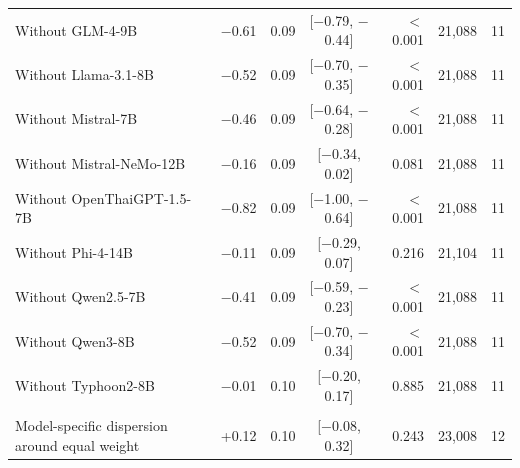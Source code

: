 \begin{tabular}{@{}lrrcrrr@{}}
\quad Without GLM-4-9B & \ensuremath{-}0.61 & 0.09 & [\ensuremath{-}0.79, \ensuremath{-}0.44] & $<$0.001 & 21,088 & 11 \\
\quad Without Llama-3.1-8B & \ensuremath{-}0.52 & 0.09 & [\ensuremath{-}0.70, \ensuremath{-}0.35] & $<$0.001 & 21,088 & 11 \\
\quad Without Mistral-7B & \ensuremath{-}0.46 & 0.09 & [\ensuremath{-}0.64, \ensuremath{-}0.28] & $<$0.001 & 21,088 & 11 \\
\quad Without Mistral-NeMo-12B & \ensuremath{-}0.16 & 0.09 & [\ensuremath{-}0.34, 0.02] & 0.081 & 21,088 & 11 \\
\quad Without OpenThaiGPT-1.5-7B & \ensuremath{-}0.82 & 0.09 & [\ensuremath{-}1.00, \ensuremath{-}0.64] & $<$0.001 & 21,088 & 11 \\
\quad Without Phi-4-14B & \ensuremath{-}0.11 & 0.09 & [\ensuremath{-}0.29, 0.07] & 0.216 & 21,104 & 11 \\
\quad Without Qwen2.5-7B & \ensuremath{-}0.41 & 0.09 & [\ensuremath{-}0.59, \ensuremath{-}0.23] & $<$0.001 & 21,088 & 11 \\
\quad Without Qwen3-8B & \ensuremath{-}0.52 & 0.09 & [\ensuremath{-}0.70, \ensuremath{-}0.34] & $<$0.001 & 21,088 & 11 \\
\quad Without Typhoon2-8B & \ensuremath{-}0.01 & 0.10 & [\ensuremath{-}0.20, 0.17] & 0.885 & 21,088 & 11 \\
\addlinespace
\multicolumn{7}{@{}l}{\textit{Post hoc, not pre-registered}} \\
\quad Model-specific dispersion around equal weight & +0.12 & 0.10 & [\ensuremath{-}0.08, 0.32] & 0.243 & 23,008 & 12 \\
\bottomrule
\end{tabular}
